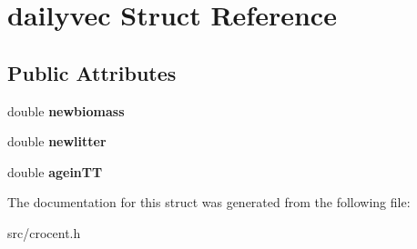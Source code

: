 \hypertarget{structdailyvec}{\section{dailyvec Struct Reference}
\label{structdailyvec}
}
\subsection*{Public Attributes}
\begin{DoxyCompactItemize}
\item 
\hypertarget{structdailyvec_a811d325896a5f4fe04b6176d473c171a}{double {\bfseries newbiomass}}\label{structdailyvec_a811d325896a5f4fe04b6176d473c171a}

\item 
\hypertarget{structdailyvec_ad5a8c8652b473005d803b07067f1ee18}{double {\bfseries newlitter}}\label{structdailyvec_ad5a8c8652b473005d803b07067f1ee18}

\item 
\hypertarget{structdailyvec_a3fbc416e8ea6f311704f6f9c8664891f}{double {\bfseries agein\-T\-T}}\label{structdailyvec_a3fbc416e8ea6f311704f6f9c8664891f}

\end{DoxyCompactItemize}


The documentation for this struct was generated from the following file\-:\begin{DoxyCompactItemize}
\item 
src/crocent.\-h\end{DoxyCompactItemize}
